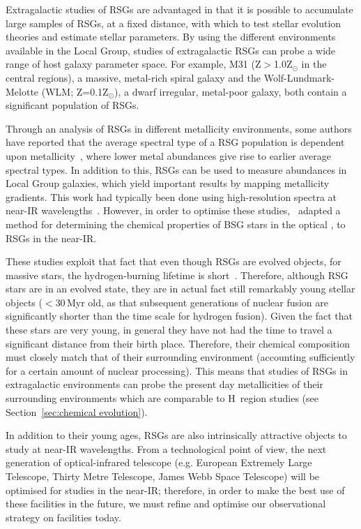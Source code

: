 Extragalactic studies of RSGs are advantaged in that it is possible to accumulate large samples of RSGs, at a fixed distance, with which to test stellar evolution theories and estimate stellar parameters.
By using the different environments available in the Local Group, studies of extragalactic RSGs can probe a wide range of host galaxy parameter space.
For example, M31 (Z$>$1.0Z$_{\odot}$ in the central regions), a massive, metal-rich spiral galaxy and the Wolf-Lundmark-Melotte (WLM; Z=0.1Z$_{\odot}$), a dwarf irregular, metal-poor galaxy, both contain a significant population of RSGs.

Through an analysis of RSGs in different metallicity environments, some authors have reported that the average spectral type of a RSG population is dependent upon metallicity~\citep{Elias85, MasseyOlsen03, 2012AJ....144....2L}, where lower metal abundances give rise to earlier average spectral types.
In addition to this, RSGs can be used to measure abundances in Local Group galaxies, which yield important results by mapping metallicity gradients.
This work had typically been done using high-resolution spectra at near-IR wavelengths~\citep{Cunha07, Davies09a,Davies09b}.
However, in order to optimise these studies,~\cite{2010MNRAS.407.1203D} adapted a method for determining the chemical properties of BSG stars in the optical
\citep{2008ApJ...681..269K,2010AN....331..459K}, to RSGs in the near-IR.

These studies exploit that fact that even though RSGs are evolved objects, for massive stars, the hydrogen-burning lifetime is short~\citep[just over 25\,Myr for a 8\,M$_{\odot}$ star and consequently shorter for higher mass stars][]{2012A&A...537A.146E}.
Therefore, although RSG stars are in an evolved state, they are in actual fact still remarkably young stellar objects ($<$30\,Myr old, as that subsequent generations of nuclear fusion are significantly shorter than the time scale for hydrogen fusion).
Given the fact that these stars are very young, in general they have not had the time to travel a significant distance from their birth place.
Therefore, their chemical composition must closely match that of their surrounding environment (accounting sufficiently for a certain amount of nuclear processing).
This means that studies of RSGs in extragalactic environments can probe the present day metallicities of their surrounding environments which are comparable to H\,\2 region studies (see Section~\ref{sec:chemical evolution}).

In addition to their young ages, RSGs are also intrinsically attractive objects to study at near-IR wavelengths.
From a technological point of view, the next generation of optical-infrared telescope (e.g. European Extremely Large Telescope, Thirty Metre Telescope, James Webb Space Telescope) will be optimised for studies in the near-IR; therefore, in order to make the best use of these facilities in the future, we must refine and optimise our observational strategy on facilities today.

